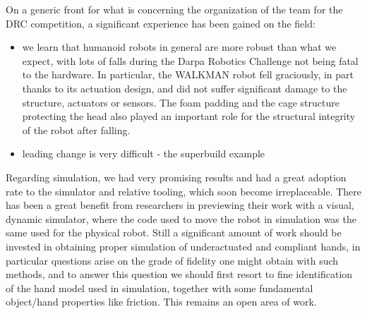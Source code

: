 \documentclass[%
	paper=A4,					%
	twoside=true,				%
	openright,			.
	parskip=full,				%
	chapterprefix=true,			%
	11pt,						%
	headings=normal,			%
	bibliography=totoc,			%
	listof=totoc,				%
	titlepage=on,				%
	captions=tableabove,		%
	draft=true,				%
]{scrreprt}%
\begin{document}
On a generic front for what is concerning the organization of the team for the DRC competition, a significant experience has been gained on the field:
\begin{itemize}
 \item we learn that humanoid robots in general are more robust than what we expect, with lots of falls during the Darpa Robotics Challenge not being fatal to the hardware. In particular, the WALKMAN robot fell graciously, in part thanks to its actuation design, and did not suffer significant damage to the structure, actuators or sensors. The foam padding and the cage structure protecting the head also played an important role for the structural integrity of the robot after falling.
 \item leading change is very difficult - the superbuild example
\end{itemize}


Regarding simulation, we had very promising results and had a great adoption rate to the simulator and relative tooling, which soon become irreplaceable. There has been a great benefit from researchers in previewing their work with a visual, dynamic simulator, where the code used to move the robot in simulation was the same used for the physical robot. Still a significant amount of work should be invested in obtaining proper simulation of underactuated and compliant hands, in particular questions arise on the grade of fidelity one might obtain with such methods, and to answer this question we should first resort to fine identification of the hand model used in simulation, together with some fundamental object/hand properties like friction. This remains an open area of work.
\end{document}
